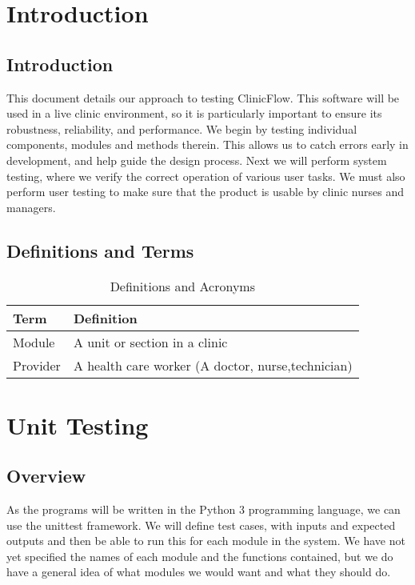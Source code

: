 \documentclass[12pt]{article}
\begin{document}
\section{Introduction}

\subsection{Introduction}
This document details our approach to testing ClinicFlow. This software will be used in a live clinic environment, so it is particularly important to ensure its robustness, reliability, and performance. We begin by testing individual components, modules and methods therein. This allows us to catch errors early in development, and help guide the design process. Next we will perform system testing, where we verify the correct operation of various user tasks. We must also perform user testing to make sure that the product is usable by clinic nurses and managers.

\subsection{Definitions and Terms} 
\begin{center}
\begin{longtable}{>{\raggedright\arraybackslash}p{}>{\raggedright\arraybackslash}p{}}
\caption{Definitions and Acronyms}\label{Table_Acronyms}\\
\toprule
\bf Term & \bf Definition\\\midrule
Module & A unit or section in a clinic \\\midrule
Provider & A health care worker (A doctor, nurse,technician) \\

\bottomrule
\end{longtable}
\end{center}

\section{Unit Testing}
\subsection{Overview}
	As the programs will be written in the Python 3 programming language, we can use the unittest framework. We will define test cases, with inputs and expected outputs and then be able to run this for each module in the system. We have not yet specified the names of each module and the functions contained, but we do have a general idea of what modules we would want and what they should do. 
\end{document}
